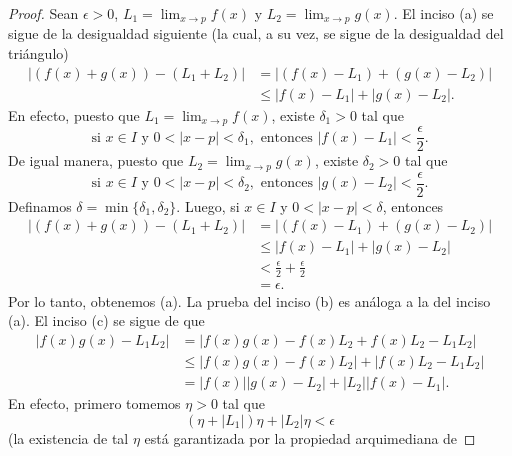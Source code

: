 \documentclass[12pt,a4paper]{book}
\begin{document}
    \begin{proof}
        Sean $\epsilon>0$, $L_{1}=\lim_{x\to p}f(x)$ y $L_{2}=\lim_{x\to p}g(x)$. El inciso
        (a) se sigue de la desigualdad siguiente (la cual, a su vez, se sigue de la
        desigualdad del triángulo)
        \begin{align*}
            |(f(x)+g(x))-(L_{1}+L_{2})|&=|(f(x)-L_{1})+(g(x)-L_{2})|\\
            &\leq|f(x)-L_{1}|+|g(x)-L_{2}|.
        \end{align*}
        En efecto, puesto que $L_{1}=\lim_{x\to p}f(x)$, existe $\delta_{1}>0$ tal que
        \begin{equation*}
            \text{si }x\in I\text{ y }0<|x-p|<\delta_{1},\text{ entonces }|f(x)-L_{1}|<\frac{\epsilon}{2}.
        \end{equation*}
        De igual manera, puesto que $L_{2}=\lim_{x\to p}g(x)$, existe $\delta_{2}>0$ tal que
        \begin{equation*}
            \text{si }x\in I\text{ y }0<|x-p|<\delta_{2},\text{ entonces }|g(x)-L_{2}|<\frac{\epsilon}{2}.
        \end{equation*}
        Definamos $\delta=\min\{\delta_{1},\delta_{2}\}$. Luego, si $x\in I$ y $0<|x-p|<\delta$, entonces
        \begin{align*}
            |(f(x)+g(x))-(L_{1}+L_{2})|&=|(f(x)-L_{1})+(g(x)-L_{2})|\\
            &\leq|f(x)-L_{1}|+|g(x)-L_{2}|\\
            &<\frac{\epsilon}{2}+\frac{\epsilon}{2}\\
            &=\epsilon.
        \end{align*}
        Por lo tanto, obtenemos (a). La prueba del inciso (b) es análoga a la del inciso
        (a). El inciso (c) se sigue de que
        \begin{align*}
            |f(x)g(x)-L_{1}L_{2}|&=|f(x)g(x)-f(x)L_{2}+f(x)L_{2}-L_{1}L_{2}|\\
            &\leq|f(x)g(x)-f(x)L_{2}|+|f(x)L_{2}-L_{1}L_{2}|\\
            &=|f(x)||g(x)-L_{2}|+|L_{2}||f(x)-L_{1}|.
        \end{align*}
        En efecto, primero tomemos $\eta>0$ tal que
        \begin{equation}\label{eq:4.4}
            (\eta+|L_{1}|)\eta+|L_{2}|\eta<\epsilon
        \end{equation}
        (la existencia de tal $\eta$ está garantizada por la propiedad arquimediana de

\end{proof}
\end{document}
